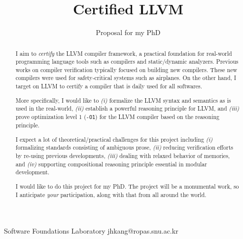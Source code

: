 \documentclass[nocopyrightspace]{sigplanconf}
\begin{document}
\setlength{\pdfpageheight}{\paperheight}
\setlength{\pdfpagewidth}{\paperwidth}






\title{Certified LLVM}
\subtitle{Proposal for my PhD}

           {Software Foundations Laboratory}
           {jhkang@ropas.snu.ac.kr}

\maketitle

\begin{abstract}
  I aim to \emph{certify} the LLVM compiler framework, a practical
  foundation for real-world programming language tools such as
  compilers and static/dynamic analyzers.  Previous works on compiler
  verification typically focused on building new compilers.  These new
  compilers were used for safety-critical systems such as airplanes.
  On the other hand, I target on LLVM to certify a compiler that is
  daily used for all softwares.

  More specifically, I would like to \emph{(i)} formalize the LLVM
  syntax and semantics as is used in the real-world, \emph{(ii)}
  establish a powerful reasoning principle for LLVM, and \emph{(iii)}
  prove optimization level 1 (\texttt{-O1}) for the LLVM compiler
  based on the reasoning principle.

  I expect a lot of theoretical/practical challenges for this project
  including \emph{(i)} formalizing standards consisting of ambiguous
  prose, \emph{(ii)} reducing verification efforts by re-using
  previous developments, \emph{(iii)} dealing with relaxed behavior of
  memories, and \emph{(iv)} supporting compositional reasoning
  principle essential in modular development.

  I would like to do this project for my PhD.  The project will be a
  monumental work, so I anticipate \emph{your} participation, along
  with that from all around the world.
\end{abstract}
\end{document}
